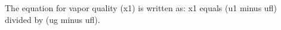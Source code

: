 The equation for vapor quality (x1) is written as:  
x1 equals (u1 minus ufl) divided by (ug minus ufl).